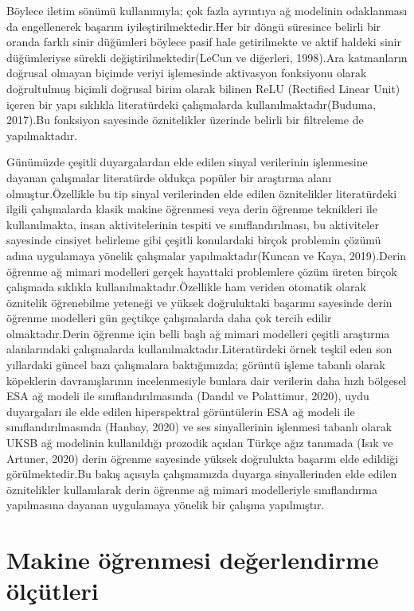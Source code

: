 \documentclass[12pt,twoside]{deuthesis}
\begin{document}
Böylece iletim sönümü kullanımıyla; çok fazla ayrıntıya ağ modelinin odaklanması da engellenerek başarım iyileştirilmektedir.Her bir döngü süresince belirli bir oranda farklı sinir düğümleri böylece pasif hale getirilmekte ve aktif haldeki sinir düğümleriyse sürekli değiştirilmektedir(LeCun ve diğerleri, 1998).Ara katmanların doğrusal olmayan biçimde veriyi işlemesinde aktivasyon fonksiyonu olarak doğrultulmuş biçimli doğrusal birim olarak bilinen ReLU (Rectified Linear Unit) içeren bir yapı sıklıkla literatürdeki çalışmalarda kullanılmaktadır(Buduma, 2017).Bu fonksiyon sayesinde öznitelikler üzerinde belirli bir filtreleme de yapılmaktadır.

Günümüzde çeşitli duyargalardan elde edilen sinyal verilerinin işlenmesine dayanan çalışmalar literatürde oldukça popüler bir araştırma alanı olmuştur.Özellikle bu tip sinyal verilerinden elde edilen öznitelikler literatürdeki ilgili çalışmalarda klasik makine öğrenmesi veya derin öğrenme teknikleri ile kullanılmakta, insan aktivitelerinin tespiti ve sınıflandırılması, bu aktiviteler sayesinde cinsiyet belirleme gibi çeşitli konulardaki birçok problemin çözümü adına uygulamaya yönelik çalışmalar yapılmaktadır(Kuncan ve Kaya, 2019).Derin öğrenme ağ mimari modelleri gerçek hayattaki problemlere çözüm üreten birçok çalışmada sıklıkla kullanılmaktadır.Özellikle ham veriden otomatik olarak öznitelik öğrenebilme yeteneği ve yüksek doğruluktaki başarımı sayesinde derin öğrenme modelleri gün geçtikçe çalışmalarda daha çok tercih edilir olmaktadır.Derin öğrenme için belli başlı ağ mimari modelleri çeşitli araştırma alanlarındaki çalışmalarda kullanılmaktadır.Literatürdeki örnek teşkil eden son yıllardaki güncel bazı çalışmalara baktığımızda; görüntü işleme tabanlı olarak köpeklerin davranışlarının incelenmesiyle bunlara dair verilerin daha hızlı bölgesel ESA ağ modeli ile sınıflandırılmasında (Dandıl ve Polattimur, 2020), uydu duyargaları ile elde edilen hiperspektral görüntülerin ESA ağ modeli ile sınıflandırılmasında (Hanbay, 2020) ve ses sinyallerinin işlenmesi tabanlı olarak UKSB ağ modelinin kullanıldığı prozodik açıdan Türkçe ağız tanımada (Isık ve Artuner, 2020) derin öğrenme sayesinde yüksek doğrulukta başarım elde edildiği görülmektedir.Bu bakış açısıyla çalışmamızda duyarga sinyallerinden elde edilen öznitelikler kullanılarak derin öğrenme ağ mimari modelleriyle sınıflandırma yapılmasına dayanan uygulamaya yönelik bir çalışma yapılmıştır.

\hypertarget{makine-uxf6ux11frenmesi-deux11ferlendirme-uxf6luxe7uxfctleri}{%
\section{Makine öğrenmesi değerlendirme ölçütleri}\label{makine-uxf6ux11frenmesi-deux11ferlendirme-uxf6luxe7uxfctleri}}
\end{document}
